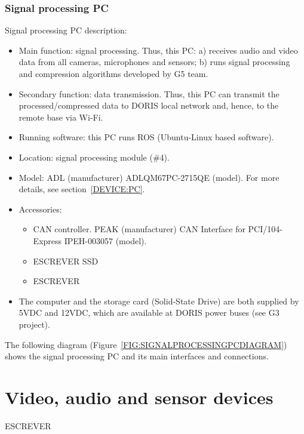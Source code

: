 \subsubsection{Signal processing PC}
Signal processing PC description:
  \begin{itemize}
    \item Main function: signal processing. Thus, this PC: a) receives audio and video data from all cameras, microphones and sensors; b) runs signal processing and compression algorithms developed by G5 team.
    \item Secondary function: data transmission. Thus, this PC can transmit the processed/compressed data to DORIS local network and, hence, to the remote base via Wi-Fi.
    \item Running software: this PC runs ROS (Ubuntu-Linux based software).
    \item Location: signal processing module (\#4).
    \item Model: ADL (manufacturer) ADLQM67PC-2715QE (model). For more details, see section~\ref{DEVICE:PC}.
    \item Accessories:
    \begin{itemize}
      \item CAN controller. PEAK (manufacturer) CAN Interface for PCI/104-Express IPEH-003057 (model).
      \item ESCREVER SSD
      \item ESCREVER
    \end{itemize}
    \item The computer and the storage card (Solid-State Drive) are both supplied by 5VDC and 12VDC, which are available at DORIS power buses (see G3 project).
  \end{itemize}
The following diagram (Figure~\ref{FIG:SIGNALPROCESSINGPCDIAGRAM}) shows the signal processing PC and its main interfaces and connections.

\section{Video, audio and sensor devices}
ESCREVER

